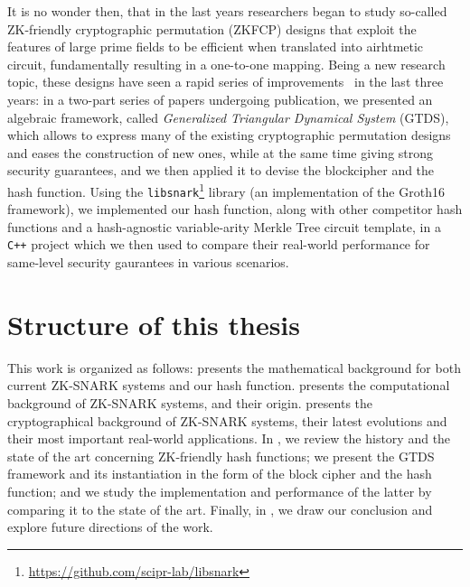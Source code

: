 It is no wonder then, that in the last years researchers began to study so-called ZK-friendly 
cryptographic permutation (ZKFCP) designs that exploit the features of large prime fields to be 
efficient when translated into airhtmetic circuit, fundamentally resulting in a one-to-one mapping.
Being a new research topic, these designs have seen a rapid series of 
improvements~\cite{AlbrechtGRRT2016,GrassiKRRS2021,GrassiHRSWW2022} in the last three years:
in a two-part series of papers undergoing publication, we presented an algebraic 
framework, called \emph{Generalized Triangular Dynamical System} (GTDS), which allows to express
many of the existing cryptographic permutation designs and eases the construction of new ones, while
at the same time giving strong security guarantees, and we then applied it to devise the \Arion{}
blockcipher and the \Arionhash{} hash function.
Using the \texttt{libsnark}\footnote{\url{https://github.com/scipr-lab/libsnark}} library (an 
implementation of the Groth16 framework), we implemented our hash function, along with other 
competitor hash functions and a hash-agnostic variable-arity Merkle Tree circuit template, in a 
\texttt{C++} project which we then used to compare their real-world performance for same-level 
security gaurantees in various scenarios.

\section*{Structure of this thesis}
This work is organized as follows:  presents the mathematical background for 
both current ZK-SNARK systems and our hash function.
 presents the computational background of ZK-SNARK systems, and their origin.
 presents the cryptographical background of ZK-SNARK systems, their latest 
evolutions and their most important real-world applications.
In , we review the history and the state of the art concerning ZK-friendly hash 
functions; we present the GTDS framework and its instantiation in the form of the \Arion{} block 
cipher and the \Arionhash{} hash function; and we study the implementation and performance 
of the latter by comparing it to the state of the art. 
Finally, in , we draw our conclusion and explore future directions of the 
work.
